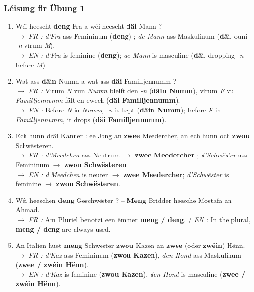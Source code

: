 \subsubsection*{Léisung fir Übung 1}
\begin{enumerate}
    \item Wéi heescht \textbf{deng} Fra a wéi heescht \textbf{däi} Mann ? \\
    $\rightarrow$ \textit{FR :} \textit{d'Fra} ass Femininum (\textbf{deng}) ; \textit{de Mann} ass Maskulinum (\textbf{däi}, ouni \textit{-n} virum \textit{M}). \\
    $\rightarrow$ \textit{EN :} \textit{d'Fra} is feminine (\textbf{deng}); \textit{de Mann} is masculine (\textbf{däi}, dropping \textit{-n} before \textit{M}).
    \item Wat ass \textbf{däin} Numm a wat ass \textbf{däi} Familljennumm ? \\
    $\rightarrow$ \textit{FR :} Virum \textit{N} vun \textit{Numm} bleift den \textit{-n} (\textbf{däin Numm}), virum \textit{F} vu \textit{Familljennumm} fält en ewech (\textbf{däi Familljennumm}). \\
    $\rightarrow$ \textit{EN :} Before \textit{N} in \textit{Numm}, \textit{-n} is kept (\textbf{däin Numm}); before \textit{F} in \textit{Familljennumm}, it drops (\textbf{däi Familljennumm}).
    \item Ech hunn dräi Kanner : ee Jong an \textbf{zwee} Meedercher, an ech hunn och \textbf{zwou} Schwësteren. \\
    $\rightarrow$ \textit{FR :} \textit{d'Meedchen} ass Neutrum $\rightarrow$ \textbf{zwee Meedercher} ; \textit{d'Schwëster} ass Femininum $\rightarrow$ \textbf{zwou Schwësteren}. \\
    $\rightarrow$ \textit{EN :} \textit{d'Meedchen} is neuter $\rightarrow$ \textbf{zwee Meedercher}; \textit{d'Schwëster} is feminine $\rightarrow$ \textbf{zwou Schwësteren}.
    \item Wéi heeschen \textbf{deng} Geschwëster ? -- \textbf{Meng} Bridder heesche Mostafa an Ahmad. \\
    $\rightarrow$ \textit{FR :} Am Pluriel benotzt een ëmmer \textbf{meng / deng}. / \textit{EN :} In the plural, \textbf{meng / deng} are always used.
    \item An Italien huet \textbf{meng} Schwëster \textbf{zwou} Kazen an \textbf{zwee} (oder \textbf{zwéin}) Hënn. \\
    $\rightarrow$ \textit{FR :} \textit{d'Kaz} ass Femininum (\textbf{zwou Kazen}), \textit{den Hond} ass Maskulinum (\textbf{zwee / zwéin Hënn}). \\
    $\rightarrow$ \textit{EN :} \textit{d'Kaz} is feminine (\textbf{zwou Kazen}), \textit{den Hond} is masculine (\textbf{zwee / zwéin Hënn}).
\end{enumerate}

